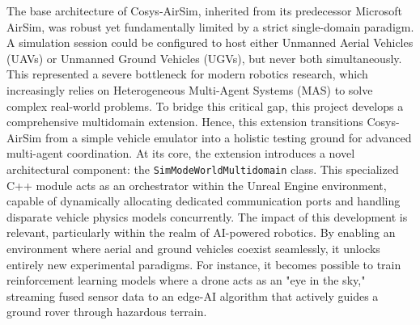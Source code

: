 The base architecture of Cosys-AirSim, inherited from its predecessor Microsoft AirSim, was robust yet fundamentally limited by a strict single-domain paradigm. A simulation session could be configured to host either Unmanned Aerial Vehicles (UAVs) or Unmanned Ground Vehicles (UGVs), but never both simultaneously. This represented a severe bottleneck for modern robotics research, which increasingly relies on Heterogeneous Multi-Agent Systems (MAS) to solve complex real-world problems.\newline\newline
To bridge this critical gap, this project develops a comprehensive multidomain extension. Hence, this extension transitions Cosys-AirSim from a simple vehicle emulator into a holistic testing ground for advanced multi-agent coordination. At its core, the extension introduces a novel architectural component: the \texttt{SimModeWorldMultidomain} class. This specialized C++ module acts as an orchestrator within the Unreal Engine environment, capable of dynamically allocating dedicated communication ports and handling disparate vehicle physics models concurrently.\newline\newline
The impact of this development is relevant,  particularly within the realm of AI-powered robotics. By enabling an environment where aerial and ground vehicles coexist seamlessly, it unlocks entirely new experimental paradigms. For instance, it becomes possible to train reinforcement learning models where a drone acts as an "eye in the sky," streaming fused sensor data to an edge-AI algorithm that actively guides a ground rover through hazardous terrain. \newline
